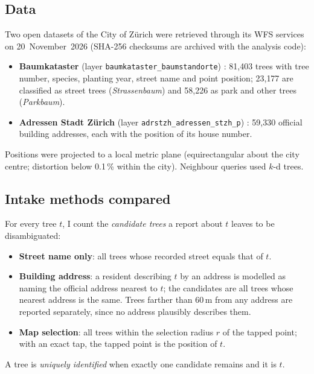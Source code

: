\documentclass[11pt,a4paper]{article}
\begin{document}
\subsection{Data}

Two open datasets of the City of Zürich were retrieved through its WFS services on 20~November~2026 (SHA-256 checksums are archived with the analysis code):

\begin{itemize}
  \item \textbf{Baumkataster} (layer \texttt{baumkataster\_baumstandorte}) \cite{zh-baum}: 81{,}403 trees with tree number, species, planting year, street name and point position; 23{,}177 are classified as street trees (\emph{Strassenbaum}) and 58{,}226 as park and other trees (\emph{Parkbaum}).
  \item \textbf{Adressen Stadt Zürich} (layer \texttt{adrstzh\_adressen\_stzh\_p}) \cite{zh-adr}: 59{,}330 official building addresses, each with the position of its house number.
\end{itemize}

Positions were projected to a local metric plane (equirectangular about the city centre; distortion below 0.1\,\% within the city). Neighbour queries used $k$-d trees.

\subsection{Intake methods compared}

For every tree $t$, I count the \emph{candidate trees} a report about $t$ leaves to be disambiguated:

\begin{itemize}
  \item \textbf{Street name only}: all trees whose recorded street equals that of $t$.
  \item \textbf{Building address}: a resident describing $t$ by an address is modelled as naming the official address nearest to $t$; the candidates are all trees whose nearest address is the same. Trees farther than 60\,m from any address are reported separately, since no address plausibly describes them.
  \item \textbf{Map selection}: all trees within the selection radius $r$ of the tapped point; with an exact tap, the tapped point is the position of $t$.
\end{itemize}

A tree is \emph{uniquely identified} when exactly one candidate remains and it is $t$.
\end{document}
